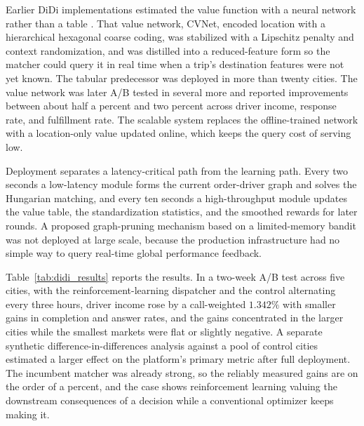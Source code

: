 Earlier DiDi implementations estimated the value function with a neural network rather than a table \citep{Qin2021dispatch,Tang2019cvnet}. That value network, CVNet, encoded location with a hierarchical hexagonal coarse coding, was stabilized with a Lipschitz penalty and context randomization, and was distilled into a reduced-feature form so the matcher could query it in real time when a trip's destination features were not yet known. The tabular predecessor was deployed in more than twenty cities. The value network was later A/B tested in several more and reported improvements between about half a percent and two percent across driver income, response rate, and fulfillment rate. The scalable system replaces the offline-trained network with a location-only value updated online, which keeps the query cost of serving low.

Deployment separates a latency-critical path from the learning path. Every two seconds a low-latency module forms the current order-driver graph and solves the Hungarian matching, and every ten seconds a high-throughput module updates the value table, the standardization statistics, and the smoothed rewards for later rounds. A proposed graph-pruning mechanism based on a limited-memory bandit was not deployed at large scale, because the production infrastructure had no simple way to query real-time global performance feedback.

Table~\ref{tab:didi_results} reports the results. In a two-week A/B test across five cities, with the reinforcement-learning dispatcher and the control alternating every three hours, driver income rose by a call-weighted $1.342\%$ with smaller gains in completion and answer rates, and the gains concentrated in the larger cities while the smallest markets were flat or slightly negative. A separate synthetic difference-in-differences analysis against a pool of control cities estimated a larger effect on the platform's primary metric after full deployment. The incumbent matcher was already strong, so the reliably measured gains are on the order of a percent, and the case shows reinforcement learning valuing the downstream consequences of a decision while a conventional optimizer keeps making it.

